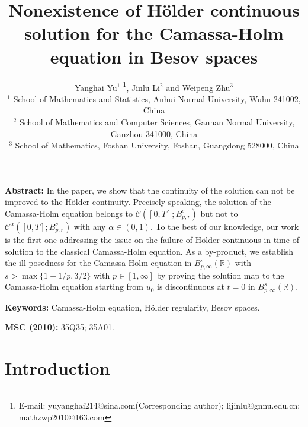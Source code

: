 \documentclass[12pt]{article}
\begin{document}
\title{Nonexistence of H\"{o}lder continuous solution for the Camassa-Holm equation in Besov spaces }
\author{Yanghai Yu$^{1,}$\footnote{E-mail: yuyanghai214@sina.com(Corresponding author); lijinlu@gnnu.edu.cn; mathzwp2010@163.com}, Jinlu Li$^{2}$  and Weipeng Zhu$^{3}$\\
\small $^1$ School of Mathematics and Statistics, Anhui Normal University, Wuhu 241002, China\\
\small $^2$ School of Mathematics and Computer Sciences, Gannan Normal University, Ganzhou 341000, China\\
\small $^3$ School of Mathematics, Foshan University, Foshan, Guangdong 528000, China}



\date{}


\maketitle\noindent{\hrulefill}

{\bf Abstract:}
In the paper, we show that the continuity of the solution can not be improved to the H\"{o}lder continuity. Precisely speaking, the solution of the Camassa-Holm equation belongs to $\mathcal{C}([0,T];B^s_{p,r})$ but not to $\mathcal{C}^\alpha([0,T];B^s_{p,r})$ with any $\alpha\in(0,1)$. To the best of our knowledge, our work is the first one addressing the issue on the failure of H\"{o}lder continuous in time of solution to the classical Camassa-Holm equation.
As a by-product, we establish the ill-posedness for the Camassa-Holm equation in $B^s_{p,\infty}(\mathbb{R})$ with $s>\max\big\{1+1/p, 3/2\big\}$ with $p\in[1,\infty]$ by proving the solution map to the Camassa-Holm equation starting from $u_0$ is discontinuous at $t = 0$ in $B^s_{p,\infty}(\mathbb{R})$.


{\bf Keywords:} Camassa-Holm equation, H\"{o}lder regularity, Besov spaces.

{\bf MSC (2010):} 35Q35; 35A01.
\vskip0mm\noindent{\hrulefill}

\section{Introduction}
\end{document}

